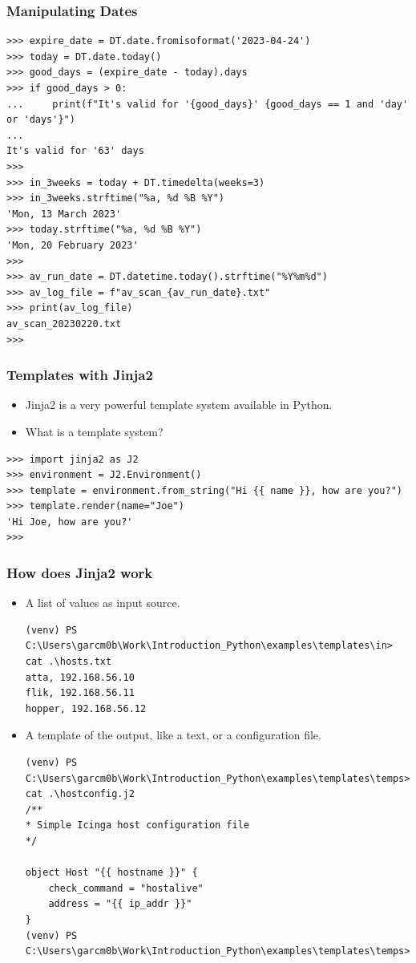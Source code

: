\documentclass[aspectratio=169]{beamer}
\begin{document}
\begin{frame}[fragile]
\frametitle{Manipulating Dates}

\scriptsize
\begin{verbatim}
>>> expire_date = DT.date.fromisoformat('2023-04-24')
>>> today = DT.date.today()
>>> good_days = (expire_date - today).days
>>> if good_days > 0:
...     print(f"It's valid for '{good_days}' {good_days == 1 and 'day' or 'days'}")
...
It's valid for '63' days                                                                                                       >>>
>>> in_3weeks = today + DT.timedelta(weeks=3)
>>> in_3weeks.strftime("%a, %d %B %Y")
'Mon, 13 March 2023'
>>> today.strftime("%a, %d %B %Y")
'Mon, 20 February 2023'
>>>
>>> av_run_date = DT.datetime.today().strftime("%Y%m%d")
>>> av_log_file = f"av_scan_{av_run_date}.txt"
>>> print(av_log_file)
av_scan_20230220.txt
>>>
\end{verbatim}
\end{frame}

\begin{frame}[fragile]
\frametitle{Templates with Jinja2}
\begin{itemize}
    \item Jinja2 is a very powerful template system available in Python. 
    \item What is a template system?
\end{itemize}

\scriptsize
\begin{verbatim}
>>> import jinja2 as J2
>>> environment = J2.Environment()
>>> template = environment.from_string("Hi {{ name }}, how are you?")
>>> template.render(name="Joe")
'Hi Joe, how are you?'
>>>    
\end{verbatim}
\end{frame}

\begin{frame}[fragile]
\frametitle{How does Jinja2 work}
\begin{itemize}
    \item A list of values as input source.
    \tiny
    \begin{verbatim}
(venv) PS C:\Users\garcm0b\Work\Introduction_Python\examples\templates\in> cat .\hosts.txt
atta, 192.168.56.10
flik, 192.168.56.11
hopper, 192.168.56.12        
    \end{verbatim}
    \normalsize
    \item A template of the output, like a text, or a configuration file.
    \tiny
    \begin{verbatim}
(venv) PS C:\Users\garcm0b\Work\Introduction_Python\examples\templates\temps> cat .\hostconfig.j2
/**
* Simple Icinga host configuration file
*/

object Host "{{ hostname }}" {
    check_command = "hostalive"
    address = "{{ ip_addr }}"
}
(venv) PS C:\Users\garcm0b\Work\Introduction_Python\examples\templates\temps>
    \end{verbatim}
    \normalsize
\end{itemize}
\end{frame}
\end{document}

